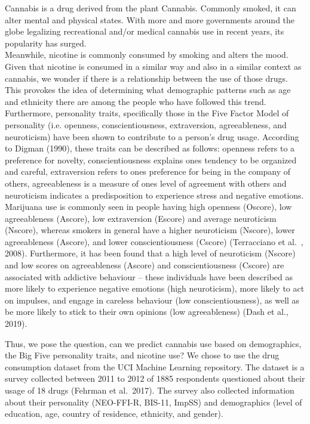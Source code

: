 \documentclass[
]{article}
\begin{document}
Cannabis is a drug derived from the plant Cannabis. Commonly smoked, it
can alter mental and physical states. With more and more governments
around the globe legalizing recreational and/or medical cannabis use in
recent years, its popularity has surged.\\
Meanwhile, nicotine is commonly consumed by smoking and alters the mood.
Given that nicotine is consumed in a similar way and also in a similar
context as cannabis, we wonder if there is a relationship between the
use of those drugs. This provokes the idea of determining what
demographic patterns such as age and ethnicity there are among the
people who have followed this trend. Furthermore, personality traits,
specifically those in the Five Factor Model of personality (i.e.
openness, conscientiousness, extraversion, agreeableness, and
neuroticism) have been shown to contribute to a person's drug usage.
According to Digman (1990), these traits can be described as follows:
openness refers to a preference for novelty, conscientiousness explains
one\textquotesingle s tendency to be organized and careful, extraversion refers to
one\textquotesingle s preference for being in the company of others, agreeableness is a
measure of one\textquotesingle s level of agreement with others and neuroticism
indicates a predisposition to experience stress and negative emotions.
Marijuana use is commonly seen in people having high openness (Oscore),
low agreeableness (Ascore), low extraversion (Escore) and average
neuroticism (Nscore), whereas smokers in general have a higher
neuroticism (Nscore), lower agreeableness (Ascore), and lower
conscientiousness (Cscore) (Terracciano et al.~, 2008). Furthermore, it
has been found that a high level of neuroticism (Nscore) and low scores
on agreeableness (Ascore) and conscientiousness (Cscore) are associated
with addictive behaviour -- these individuals have been described as
more likely to experience negative emotions (high neuroticism), more
likely to act on impulses, and engage in careless behaviour (low
conscientiousness), as well as be more likely to stick to their own
opinions (low agreeableness) (Dash et al., 2019).

Thus, we pose the question, can we predict cannabis use based on
demographics, the Big Five personality traits, and nicotine use? We
chose to use the drug consumption dataset from the UCI Machine Learning
repository. The dataset is a survey collected between 2011 to 2012 of
1885 respondents questioned about their usage of 18 drugs (Fehrman et
al.~2017). The survey also collected information about their personality
(NEO-FFI-R, BIS-11, ImpSS) and demographics (level of education, age,
country of residence, ethnicity, and gender).
\end{document}

